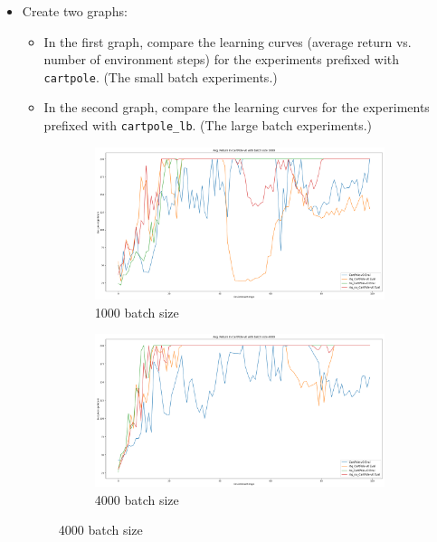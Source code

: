 \documentclass{article}
\begin{document}
\begin{itemize}
\item Create two graphs:
\begin{itemize}
\item In the first graph, compare the learning curves (average return vs. number of environment steps) for the experiments prefixed with \verb|cartpole|. (The small batch experiments.)
\item In the second graph, compare the learning curves for the experiments prefixed with \verb|cartpole_lb|. (The large batch experiments.)
\end{itemize}

\begin{figure}[!h]
	\centering
	\begin{subfigure}{0.48\textwidth}
		\includegraphics[width=0.9\linewidth]{hw2_pg_small_batch.png} 
		\caption{1000 batch size}
		\label{fig:1}
	\end{subfigure}
	\begin{subfigure}{0.48\textwidth}
		\includegraphics[width=0.9\linewidth]{hw2_pg_large_batch.png}
		\caption{4000 batch size}
		\label{fig:2}
	\end{subfigure}
\end{figure}



\end{itemize}
\end{document}
